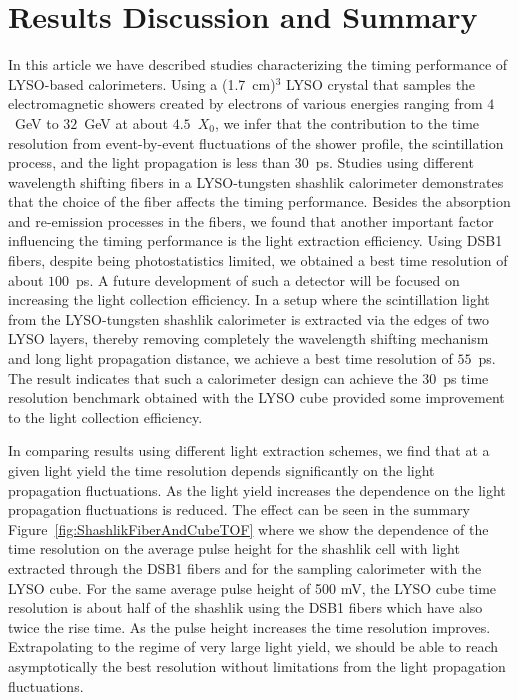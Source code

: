 \section{Results Discussion and Summary }

In this article we have described studies characterizing the timing performance
of LYSO-based calorimeters. Using a (1.7~cm)$^{3}$ LYSO crystal that
samples the electromagnetic showers created by electrons of various energies
ranging from $4$~GeV to $32$~GeV at about $4.5$~$X_{0}$, we infer that the
contribution to the time resolution from event-by-event fluctuations of the
shower profile, the scintillation process, and the light propagation is less than
$30$~ps. Studies using different wavelength shifting fibers in a LYSO-tungsten shashlik calorimeter 
demonstrates that the choice of the fiber affects the timing performance. Besides the absorption 
and re-emission processes in the fibers, we found that another important factor influencing
the timing performance is the light extraction efficiency. Using DSB1 fibers, despite being 
photostatistics limited, we obtained a best time resolution of about $100$~ps.  A future 
development of such a detector will  be focused on increasing the light collection efficiency.
In a setup where  the scintillation light from the LYSO-tungsten
shashlik calorimeter is extracted via the edges of two LYSO layers, thereby
removing completely the wavelength shifting mechanism and long light propagation distance, 
we achieve a best time resolution of $55$~ps. The result  indicates  that such a
calorimeter design can achieve the $30$~ps time resolution benchmark obtained with the LYSO cube
provided some improvement to the light collection efficiency. 

In comparing results using different light extraction schemes, we find that at a
given light yield the time resolution depends significantly on the light
propagation fluctuations. As the light yield increases the dependence on the
light propagation fluctuations is reduced. The effect can be seen in the summary
Figure~\ref{fig:ShashlikFiberAndCubeTOF} where we show the dependence of the
time resolution on the average pulse height for the shashlik cell with light
extracted through the DSB1 fibers and for the sampling calorimeter with the LYSO
cube. For the same average pulse height of 500 mV, the LYSO cube time resolution
is about half of the shashlik using the DSB1 fibers which have also twice the
rise time. As the pulse height increases the time resolution improves.
Extrapolating to the regime of very large light yield, we should be able to
reach asymptotically the best resolution without limitations from the light
propagation fluctuations. 


